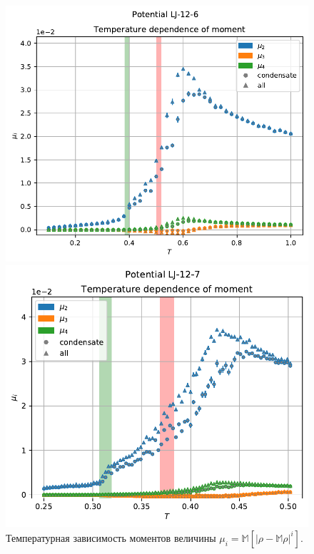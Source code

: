 \documentclass[pdf,hyperref={unicode}]{beamer}
\begin{document}
\begin{frame}
\begin{figure}[h]
\begin{center}
\begin{minipage}[h]{0.35\linewidth}
\includegraphics[width=\textwidth, keepaspectratio]{plot_moment_Potential LJ-12-6_1}
\end{minipage}
\begin{minipage}[h]{0.35\linewidth}
\includegraphics[width=\textwidth, keepaspectratio]{plot_moment_Potential LJ-12-7_1}
\end{minipage}
\caption{\tiny Температурная зависимость моментов величины $\mu_i = \mathbb{M} \left[ |\rho - \mathbb{M} \rho|^i \right]$.}
\label{risMu}
\end{center}
\end{figure}

\end{frame}
\end{document}
